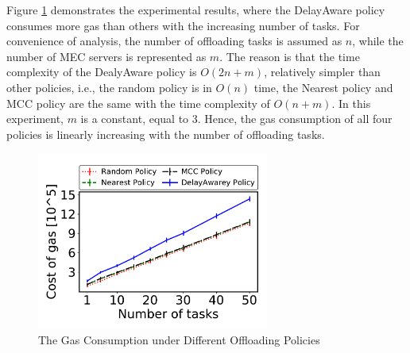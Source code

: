 

Figure \ref{fig:Gas} demonstrates the experimental results, where the DelayAware policy consumes more gas than others with the increasing number of tasks.
For convenience of analysis, the number of offloading tasks is assumed as $n$, while the number of MEC servers is represented as $m$.
The reason is that the time complexity of the DealyAware policy is $O(2n+m)$, relatively simpler than other policies, i.e., the random policy is in $O(n)$ time, the Nearest policy and MCC policy are the same with the time complexity of $O(n+m)$.
In this experiment, $m$ is a constant, equal to 3.
Hence, the gas consumption of all four policies is linearly increasing with the number of offloading tasks.

\begin{figure}[t]
\centering
\includegraphics[width=3in]{Fig/PolicyGas.pdf}
\caption{The Gas Consumption under Different Offloading Policies}
\label{fig:Gas}
\end{figure}

